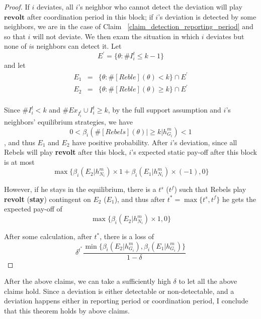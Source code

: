 \documentclass[12pt,letterpaper]{article}
\theoremstyle{definition}
\theoremstyle{remark}
\theoremstyle{claim}
\begin{document}
\begin{proof}


If $i$ deviates, all $i$'s neighbor who cannot detect the deviation will play $\textbf{revolt}$ after coordination period in this block; if $i$'s deviation is detected by some neighbors, we are in the case of Claim ~\ref{claim_detection_reporting_period} and so that $i$ will not deviate. We then exam the situation in which $i$ deviates but none of $i$s neighbors can detect it.
Let 
\[E^{'}=\{\theta:\#I^{t}_i\leq k-1\}\]
and let 
\begin{eqnarray*}
E_1&=&\{\theta: \#[Reble](\theta)<k\}\cap E^{'}\\
E_2&=&\{\theta: \#[Reble](\theta)\geq k\}\cap E^{'}\\
\end{eqnarray*}

Since $\# I^t_i<k$ and $\# Ex_{I^{t}_i}\cup I^{t}_i \geq k$, by the full support assumption and $i$'s neighbors' equilibrium strategies, we have 
\[0<\beta_{i}(\#[Rebels](\theta)|\geq k|h^{m}_{G_i})<1\], and thus $E_1$ and $E_2$ have positive probability. After $i$'s deviation, since all Rebels will play \textbf{revolt} after this block, $i$'s expected static pay-off after this block is at most 
\[
{\max\{\beta_{i}(E_2|h^{m}_{N_i})\times 1+\beta_{i}(E_1|h^{m}_{N_i})\times (-1), 0\}}
\]

However, if he stays in the equilibrium, there is a $t^s$ ($t^f$) such that Rebels play \textbf{revolt} (\textbf{stay}) contingent on $E_2$ ($E_1$), and thus after $t^*=\max\{t^s,t^f\}$ he gets the expected pay-off of
\[
{\max\{\beta_{i}(E_2|h^{m}_{N_i})\times 1, 0\}}
\]

After some calculation, after $t^*$, there is a loss of
\[\delta^{t^{*}}\frac{\min\{\beta_{i}(E_2|h^{m}_{G_i}),\beta_{i}(E_1|h^{m}_{G_i})\}}{1-\delta}\]

\end{proof}

After the above claims, we can take a sufficiently high $\delta$ to let all the above claims hold. Since a deviation is either detectable or non-detectable, and a deviation happens either in reporting period or coordination period, I conclude that this theorem holds by above claims. 
\end{document}
